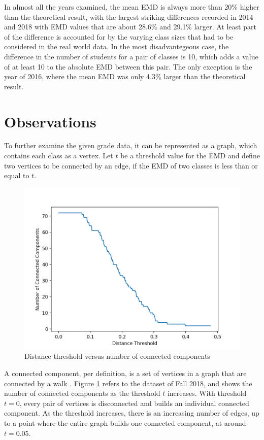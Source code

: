 \documentclass[12pt,letterpaper,oneside,openany]{book}
\begin{document}
In almost all the years examined, the mean EMD is always more than 20\% higher than the theoretical result, with the largest striking differences recorded in 2014 and 2018 with EMD values that are about 28.6\% and 29.1\% larger. At least part of the difference is accounted for by the varying class sizes that had to be considered in the real world data. In the most disadvantegeous case, the difference in the number of students for a pair of classes is 10, which adds a value of at least 10 to the absolute EMD between this pair.
The only exception is the year of 2016, where the mean EMD was only 4.3\% larger than the theoretical result.


\setcounter{section}{1}
\section{Observations}
To further examine the given grade data, it can be represented as a graph, which contains each class as a vertex. Let $t$ be a threshold value for the EMD and define two vertices to be connected by an edge, if the EMD of two classes is less than or equal to $t$.

\begin{figure}
	\centering
	\includegraphics[width=\textwidth]{./images/n2018LLP.png}
	\caption{Distance threshold versus number of connected components }
	\label{fig:LLP18}
\end{figure}

A connected component, per definition, is a set of vertices in a graph that are connected by a walk \cite{porter2009communities}. 
Figure \ref{fig:LLP18} refers to the dataset of Fall 2018, and shows the number of connected components as the threshold $t$ increases. With threshold $t=0$, every pair of vertices is disconnected and builds an individual connected component. As the threshold increases, there is an increasing number of edges, up to a point where the entire graph builds one connected component, at around $t=0.05$.
\end{document}
